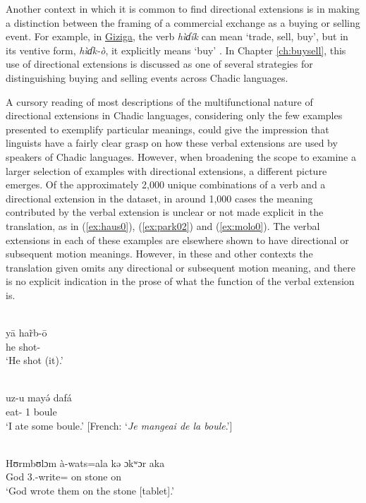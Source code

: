 Another context in which it is common to find directional extensions is in making a distinction between the framing of a commercial exchange as a buying or selling event. For example, in \hyperref[gizi]{Giziga}, the verb \textit{hìɗík} can mean `trade, sell, buy', but in its ventive form, \textit{hìɗk-ò}, it explicitly means `buy' \citep[150]{shayGrammarGizigaChadic2021}. In Chapter \ref{ch:buysell}, this use of directional extensions is discussed as one of several strategies for distinguishing buying and selling events across Chadic languages. 

A cursory reading of most descriptions of the multifunctional nature of directional extensions in Chadic languages, considering only the few examples presented to exemplify particular meanings, could give the impression that linguists have a fairly clear grasp on how these verbal extensions are used by speakers of Chadic languages. However, when broadening the scope to examine a larger selection of examples with directional extensions, a different picture emerges. Of the approximately 2,000 unique combinations of a verb and a directional extension in the dataset, in around 1,000 cases the meaning contributed by the verbal extension is unclear or not made explicit in the translation, as in (\ref{ex:haus0}), (\ref{ex:park02}) and (\ref{ex:molo0}). The verbal extensions in each of these examples are elsewhere shown to have directional or subsequent motion meanings. However, in these and other contexts the translation given omits any directional or subsequent motion meaning, and there is no explicit indication in the prose of what the function of the verbal extension is.

\ea\label{ex:haus0}
 \\
\gll  yā har̃b-ō	\\
he shot-		\\
\glt `He shot (it).'

\ex \label{ex:park02}
 \\
\gll uz-u mayə́ dafá	\\
eat- 1 boule	\\
\glt `I ate some boule.' [French: `\textit{Je mangeai de la boule}.']

\ex \label{ex:molo0}
 \\
\gll Hʊrmbʊlɔm à-wats=ala kə ɔkʷɔr aka	\\
God 3.-write= on stone on	\\
\glt `God wrote them on the stone [tablet].'
\z 

